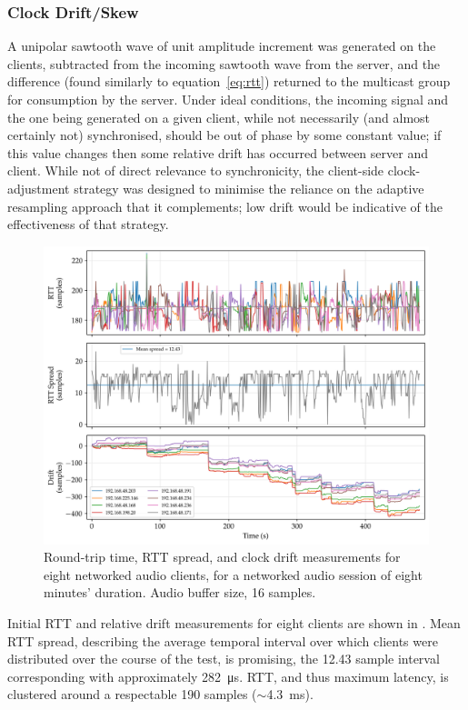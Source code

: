 \subsubsection{Clock Drift/Skew}
A unipolar sawtooth wave of unit amplitude
increment was generated on the clients, subtracted from the incoming sawtooth
wave from the server, and the difference (found similarly to
equation~\eqref{eq:rtt}) returned to the multicast group for consumption by the
server.
Under ideal conditions, the incoming signal and the one being generated on a
given client, while not necessarily (and almost certainly not) synchronised,
should be out of phase by some constant value;
if this value changes then some relative drift has occurred between server and
client.
While not of direct relevance to synchronicity, the client-side clock-adjustment
strategy was designed to minimise the reliance on the adaptive resampling
approach that it complements;
low drift would be indicative of the effectiveness of that strategy.

\begin{figure}[ht]
    \centering
    \includegraphics[width=\textwidth]{figures/rtt_drift_16}
    \caption{
        Round-trip time, RTT spread, and clock drift measurements for eight
        networked audio clients, for a networked audio session of eight minutes'
        duration.
        Audio buffer size, 16 samples.
    }
    \label{fig:rtt-drift-16}
\end{figure}

Initial RTT and relative drift measurements for eight clients are shown in
.
Mean RTT spread, describing the average temporal interval over which clients
were distributed over the course of the test, is promising, the 12.43 sample
interval corresponding with approximately \qty{282}{\us}.
RTT, and thus maximum latency, is clustered around a respectable 190 samples
($\sim$\qty{4.3}{\ms}).


